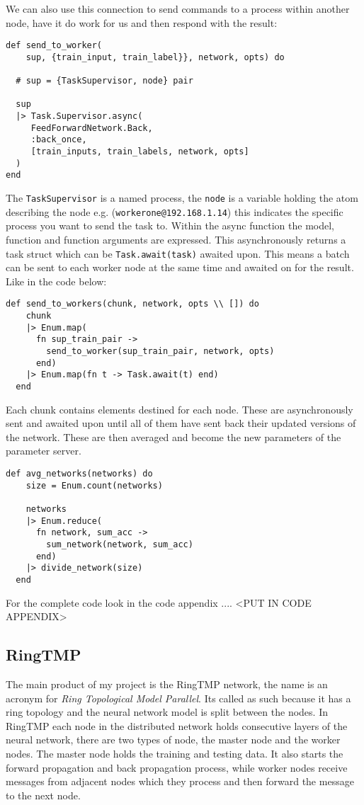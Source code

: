 We can also use this connection to send commands to a process within another
node, have it do work for us and then respond with the result:
\begin{lstlisting}[basicstyle=\linespread{0.8}\ttfamily\footnotesize]
def send_to_worker(
    sup, {train_input, train_label}}, network, opts) do

  # sup = {TaskSupervisor, node} pair

  sup
  |> Task.Supervisor.async(
     FeedForwardNetwork.Back,
     :back_once,
     [train_inputs, train_labels, network, opts]
  )
end
\end{lstlisting}
The \lstinline{TaskSupervisor} is a named process, the \lstinline{node} is a
variable holding the atom describing the node e.g.
(\lstinline{workerone@192.168.1.14}) this indicates the specific process you
want to send the task to. Within the async function the model, function and
function arguments are expressed. This asynchronously returns a task struct
which can be \lstinline{Task.await(task)} awaited upon. This means a batch can
be sent to each worker node at the same time and awaited on for the result. Like
in the code below:
\begin{lstlisting}[basicstyle=\linespread{0.8}\ttfamily\footnotesize]
  def send_to_workers(chunk, network, opts \\ []) do
    chunk
    |> Enum.map(
      fn sup_train_pair ->
        send_to_worker(sup_train_pair, network, opts)
      end)
    |> Enum.map(fn t -> Task.await(t) end)
  end
\end{lstlisting}
Each chunk contains elements destined for each node. These are asynchronously
sent and awaited upon until all of them have sent back their updated versions of
the network. These are then averaged and become the new parameters of the
parameter server.
\begin{lstlisting}[basicstyle=\linespread{0.8}\ttfamily\footnotesize]
  def avg_networks(networks) do
    size = Enum.count(networks)

    networks
    |> Enum.reduce(
      fn network, sum_acc ->
        sum_network(network, sum_acc)
      end)
    |> divide_network(size)
  end
\end{lstlisting}

For the complete code look in the code appendix .... <PUT IN CODE APPENDIX>

\subsection{RingTMP}
The main product of my project is the RingTMP network, the name is an acronym
for \textit{Ring Topological Model Parallel}. Its called as such because it has
a ring topology and the neural network model is split between the nodes. In
RingTMP each node in the distributed network holds consecutive layers of the
neural network, there are two types of node, the master node and the worker
nodes. The master node holds the training and testing data. It also starts the
forward propagation and back propagation process, while worker nodes receive
messages from adjacent nodes which they process and then forward the message to
the next node.

